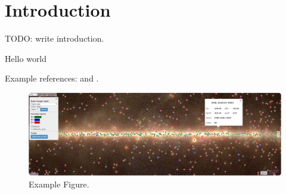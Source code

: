 \section{Introduction}

TODO: write introduction.

Hello world

Example references: \cite{2015arXiv150907408D} and \citep{2016arXiv160600393K}.

\begin{figure}[tb]
  \centerline{\includegraphics[width=\textwidth]{figures/fig1}}
  \caption{Example Figure.}
\end{figure}



\cite{tevcat}
